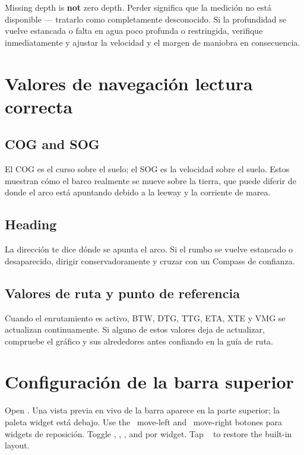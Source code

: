\begin{warningbox}
Missing depth is \textbf{not} zero depth.
Perder significa que la medición no está disponible --- tratarlo como completamente desconocido.
Si la profundidad se vuelve estancada o falta en agua poco profunda o restringida, verifique
inmediatamente y ajustar la velocidad y el margen de maniobra en consecuencia.
\end{warningbox}

\section{Valores de navegación lectura correcta}

\subsection{COG and SOG}

El COG es el curso sobre el suelo; el SOG es la velocidad sobre el suelo.
Estos muestran cómo el barco realmente se mueve sobre la tierra, que puede diferir de
donde el arco está apuntando debido a la leeway y la corriente de marea.

\subsection{Heading}

La dirección te dice dónde se apunta el arco.
Si el rumbo se vuelve estancado o desaparecido, dirigir conservadoramente y cruzar con un
Compass de confianza.

\subsection{Valores de ruta y punto de referencia}

Cuando el enrutamiento es activo, BTW, DTG, TTG, ETA, XTE y VMG se actualizan continuamente.
Si alguno de estos valores deja de actualizar, compruebe el gráfico y sus alrededores antes
confiando en la guía de ruta.

\section{Configuración de la barra superior}

Open .
Una vista previa en vivo de la barra aparece en la parte superior; la paleta widget está debajo.
Use the ~move-left and ~move-right
botones para widgets de reposición.
Toggle , , , and 
por widget.
Tap ~ to restore the built-in layout.


